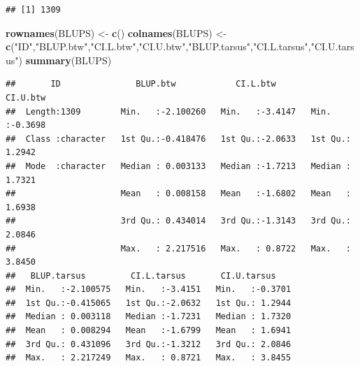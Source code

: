 \documentclass[
  12pt,
]{book}
\newenvironment{Shaded}{\begin{snugshade}}{\end{snugshade}}
\newcommand{\CommentTok}[1]{\textcolor[rgb]{0.56,0.35,0.01}{\textit{#1}}}
\newcommand{\DataTypeTok}[1]{\textcolor[rgb]{0.13,0.29,0.53}{#1}}
\newcommand{\DecValTok}[1]{\textcolor[rgb]{0.00,0.00,0.81}{#1}}
\newcommand{\KeywordTok}[1]{\textcolor[rgb]{0.13,0.29,0.53}{\textbf{#1}}}
\newcommand{\NormalTok}[1]{#1}
\newcommand{\OperatorTok}[1]{\textcolor[rgb]{0.81,0.36,0.00}{\textbf{#1}}}
\newcommand{\StringTok}[1]{\textcolor[rgb]{0.31,0.60,0.02}{#1}}
\begin{document}
\begin{verbatim}
## [1] 1309
\end{verbatim}

\begin{Shaded}
\begin{Highlighting}[]
\KeywordTok{rownames}\NormalTok{(BLUPS) \textless{}{-}}\StringTok{ }\KeywordTok{c}\NormalTok{()}
\KeywordTok{colnames}\NormalTok{(BLUPS) \textless{}{-}}\StringTok{ }\KeywordTok{c}\NormalTok{(}\StringTok{"ID"}\NormalTok{,}\StringTok{"BLUP.btw"}\NormalTok{,}\StringTok{"CI.L.btw"}\NormalTok{,}\StringTok{"CI.U.btw"}\NormalTok{,}\StringTok{"BLUP.tarsus"}\NormalTok{,}\StringTok{"CI.L.tarsus"}\NormalTok{,}\StringTok{"CI.U.tarsus"}\NormalTok{)}
\KeywordTok{summary}\NormalTok{(BLUPS)}
\end{Highlighting}
\end{Shaded}

\begin{verbatim}
##       ID               BLUP.btw            CI.L.btw          CI.U.btw      
##  Length:1309        Min.   :-2.100260   Min.   :-3.4147   Min.   :-0.3698  
##  Class :character   1st Qu.:-0.418476   1st Qu.:-2.0633   1st Qu.: 1.2942  
##  Mode  :character   Median : 0.003133   Median :-1.7213   Median : 1.7321  
##                     Mean   : 0.008158   Mean   :-1.6802   Mean   : 1.6938  
##                     3rd Qu.: 0.434014   3rd Qu.:-1.3143   3rd Qu.: 2.0846  
##                     Max.   : 2.217516   Max.   : 0.8722   Max.   : 3.8450  
##   BLUP.tarsus         CI.L.tarsus       CI.U.tarsus     
##  Min.   :-2.100575   Min.   :-3.4151   Min.   :-0.3701  
##  1st Qu.:-0.415065   1st Qu.:-2.0632   1st Qu.: 1.2944  
##  Median : 0.003118   Median :-1.7231   Median : 1.7320  
##  Mean   : 0.008294   Mean   :-1.6799   Mean   : 1.6941  
##  3rd Qu.: 0.431096   3rd Qu.:-1.3212   3rd Qu.: 2.0846  
##  Max.   : 2.217249   Max.   : 0.8721   Max.   : 3.8455
\end{verbatim}

\begin{Shaded}
\end{Shaded}
\end{document}
